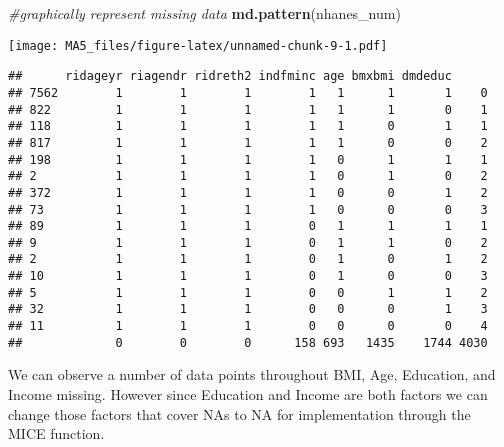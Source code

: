 \documentclass[]{article}
\newenvironment{Shaded}{\begin{snugshade}}{\end{snugshade}}
\newcommand{\KeywordTok}[1]{\textcolor[rgb]{0.13,0.29,0.53}{\textbf{#1}}}
\newcommand{\DecValTok}[1]{\textcolor[rgb]{0.00,0.00,0.81}{#1}}
\newcommand{\StringTok}[1]{\textcolor[rgb]{0.31,0.60,0.02}{#1}}
\newcommand{\CommentTok}[1]{\textcolor[rgb]{0.56,0.35,0.01}{\textit{#1}}}
\newcommand{\OtherTok}[1]{\textcolor[rgb]{0.56,0.35,0.01}{#1}}
\newcommand{\OperatorTok}[1]{\textcolor[rgb]{0.81,0.36,0.00}{\textbf{#1}}}
\newcommand{\NormalTok}[1]{#1}
\begin{document}
\begin{Shaded}
\begin{Highlighting}[]
\CommentTok{#graphically represent missing data}
\KeywordTok{md.pattern}\NormalTok{(nhanes_num)}
\end{Highlighting}
\end{Shaded}

\texttt{[image: MA5\_files/figure-latex/unnamed-chunk-9-1.pdf]}

\begin{verbatim}
##      ridageyr riagendr ridreth2 indfminc age bmxbmi dmdeduc     
## 7562        1        1        1        1   1      1       1    0
## 822         1        1        1        1   1      1       0    1
## 118         1        1        1        1   1      0       1    1
## 817         1        1        1        1   1      0       0    2
## 198         1        1        1        1   0      1       1    1
## 2           1        1        1        1   0      1       0    2
## 372         1        1        1        1   0      0       1    2
## 73          1        1        1        1   0      0       0    3
## 89          1        1        1        0   1      1       1    1
## 9           1        1        1        0   1      1       0    2
## 2           1        1        1        0   1      0       1    2
## 10          1        1        1        0   1      0       0    3
## 5           1        1        1        0   0      1       1    2
## 32          1        1        1        0   0      0       1    3
## 11          1        1        1        0   0      0       0    4
##             0        0        0      158 693   1435    1744 4030
\end{verbatim}

We can observe a number of data points throughout BMI, Age, Education,
and Income missing. However since Education and Income are both factors
we can change those factors that cover NAs to NA for implementation
through the MICE function.

\begin{Shaded}
\end{Shaded}
\end{document}

